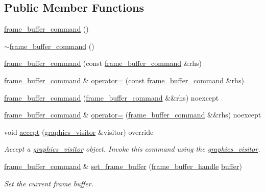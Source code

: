 \subsection*{Public Member Functions}
\begin{DoxyCompactItemize}
\item 
\mbox{\hyperlink{classmoka_1_1frame__buffer__command_ad3094b980fd94b8fd11b26bafb1c9814}{frame\+\_\+buffer\+\_\+command}} ()
\item 
\mbox{\hyperlink{classmoka_1_1frame__buffer__command_a035a2963183c0b6dcf52b1c914fbdf6e}{$\sim$frame\+\_\+buffer\+\_\+command}} ()
\item 
\mbox{\hyperlink{classmoka_1_1frame__buffer__command_aa8d7409f8c0e07c78e1c65c49ea45b02}{frame\+\_\+buffer\+\_\+command}} (const \mbox{\hyperlink{classmoka_1_1frame__buffer__command}{frame\+\_\+buffer\+\_\+command}} \&rhs)
\item 
\mbox{\hyperlink{classmoka_1_1frame__buffer__command}{frame\+\_\+buffer\+\_\+command}} \& \mbox{\hyperlink{classmoka_1_1frame__buffer__command_a64f128f3ee73772fc196c68cd86346c6}{operator=}} (const \mbox{\hyperlink{classmoka_1_1frame__buffer__command}{frame\+\_\+buffer\+\_\+command}} \&rhs)
\item 
\mbox{\hyperlink{classmoka_1_1frame__buffer__command_a6a850723eaaca2e39df65b81f91f5813}{frame\+\_\+buffer\+\_\+command}} (\mbox{\hyperlink{classmoka_1_1frame__buffer__command}{frame\+\_\+buffer\+\_\+command}} \&\&rhs) noexcept
\item 
\mbox{\hyperlink{classmoka_1_1frame__buffer__command}{frame\+\_\+buffer\+\_\+command}} \& \mbox{\hyperlink{classmoka_1_1frame__buffer__command_a5d3890ff059f2859471d9d6d6b346ba6}{operator=}} (\mbox{\hyperlink{classmoka_1_1frame__buffer__command}{frame\+\_\+buffer\+\_\+command}} \&\&rhs) noexcept
\item 
void \mbox{\hyperlink{classmoka_1_1frame__buffer__command_a72a08b1f2f64f8f93458b4c70747f439}{accept}} (\mbox{\hyperlink{classmoka_1_1graphics__visitor}{graphics\+\_\+visitor}} \&visitor) override
\begin{DoxyCompactList}\small\item\em Accept a \mbox{\hyperlink{classmoka_1_1graphics__visitor}{graphics\+\_\+visitor}} object. Invoke this command using the \mbox{\hyperlink{classmoka_1_1graphics__visitor}{graphics\+\_\+visitor}}. \end{DoxyCompactList}\item 
\mbox{\hyperlink{classmoka_1_1frame__buffer__command}{frame\+\_\+buffer\+\_\+command}} \& \mbox{\hyperlink{classmoka_1_1frame__buffer__command_ad56ea45eee3171897e0a15eb41acccf0}{set\+\_\+frame\+\_\+buffer}} (\mbox{\hyperlink{structmoka_1_1frame__buffer__handle}{frame\+\_\+buffer\+\_\+handle}} \mbox{\hyperlink{classmoka_1_1frame__buffer__command_a914e3a4d2d80c5005f71706bb800bec6}{buffer}})
\begin{DoxyCompactList}\small\item\em Set the current frame buffer. \end{DoxyCompactList}\end{DoxyCompactItemize}
